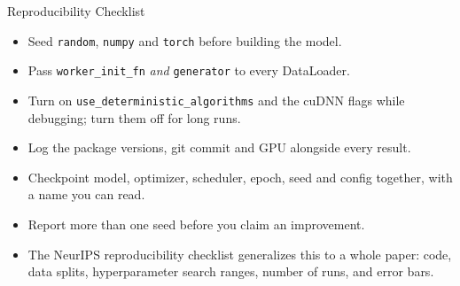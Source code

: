 \begin{frame}{Reproducibility Checklist}
\begin{itemize}
    \item[\cmark] Seed \texttt{random}, \texttt{numpy} and \texttt{torch} before building the model.
    \item[\cmark] Pass \texttt{worker\_init\_fn} \emph{and} \texttt{generator} to every DataLoader.
    \item[\cmark] Turn on \texttt{use\_deterministic\_algorithms} and the cuDNN flags while debugging; turn them off for long runs.
    \item[\cmark] Log the package versions, git commit and GPU alongside every result.
    \item[\cmark] Checkpoint model, optimizer, scheduler, epoch, seed and config together, with a name you can read.
    \item[\cmark] Report more than one seed before you claim an improvement.
\end{itemize}
\vspace{0.5em}
\begin{itemize}
    \item The NeurIPS reproducibility checklist generalizes this to a whole paper: code, data splits, hyperparameter search ranges, number of runs, and error bars.
\end{itemize}
\end{frame}
